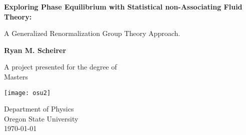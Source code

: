 \begin{titlepage}
	\begin{center}
	\vspace*{1cm}
	
	\Huge
	\textbf{Exploring Phase Equilibrium with Statistical non-Associating Fluid Theory:}
	
	\vspace{0.5cm}
	\LARGE
	A Generalized Renormalization Group Theory Approach.
	
	\vspace{1.5cm}
	
	\textbf{Ryan M. Scheirer}
	
	\vfill
	
	A project presented for the degree of\\
	Masters
	
	\vspace{0.8cm}
	
	\texttt{[image: osu2]}
	
	\Large
	Department of Physics\\
	Oregon State University\\
	\today
	
	\end{center}
\end{titlepage}